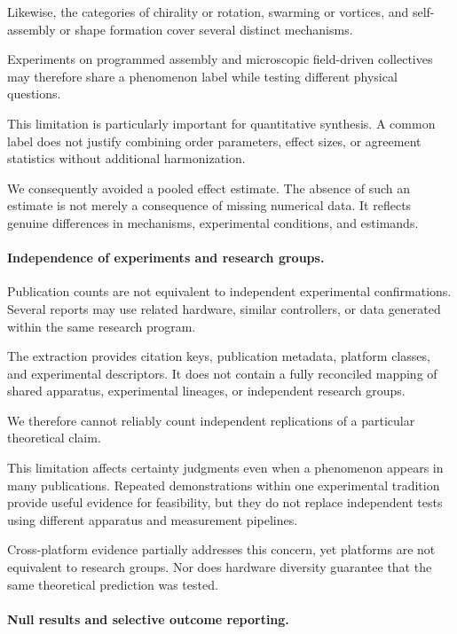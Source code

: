 Likewise, the categories of
chirality or rotation,
swarming or vortices,
and self-assembly or shape formation
cover several distinct mechanisms.

Experiments on programmed assembly
\cite{Rubenstein2014programmableselfas,Li2019particleroboticsba,Yi2025reconfigurablerobot}
and microscopic field-driven
collectives
\cite{Pauer2021programmabledesign,Sun2024multiplemagnetoopt,Cheng2025selfassemblyandco}
may therefore share a
phenomenon label while
testing different
physical questions.

This limitation is particularly
important for quantitative synthesis.
A common label does not justify
combining order parameters,
effect sizes, or agreement
statistics without additional
harmonization.

We consequently avoided a
pooled effect estimate.
The absence of such an estimate
is not merely a consequence
of missing numerical data.
It reflects genuine differences
in mechanisms, experimental
conditions, and estimands.

\paragraph*{Independence of experiments and research groups.}

Publication counts are not equivalent to
independent experimental confirmations.
Several reports may use related hardware,
similar controllers, or data generated
within the same research program.

The extraction provides citation keys,
publication metadata, platform classes,
and experimental descriptors.
It does not contain a fully reconciled
mapping of shared apparatus,
experimental lineages,
or independent research groups.

We therefore cannot reliably count
independent replications of a
particular theoretical claim.

This limitation affects
certainty judgments even
when a phenomenon appears
in many publications.
Repeated demonstrations
within one experimental
tradition provide useful
evidence for feasibility,
but they do not replace
independent tests using
different apparatus
and measurement pipelines.

Cross-platform evidence partially
addresses this concern,
yet platforms are not
equivalent to research groups.
Nor does hardware diversity
guarantee that the same
theoretical prediction
was tested.

\paragraph*{Null results and selective outcome reporting.}

